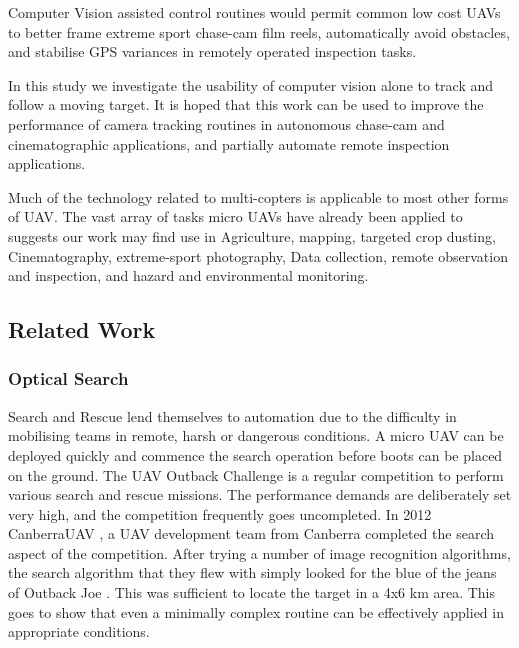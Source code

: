 \documentclass{article}
\begin{document}
      Computer Vision assisted control routines would permit common low cost UAVs to better frame extreme sport chase-cam film reels, automatically avoid obstacles, and stabilise GPS variances in remotely operated inspection tasks.

      In this study we investigate the usability of computer vision alone to track and follow a moving target.  It is hoped that this work can be used to improve the performance of camera tracking routines in autonomous chase-cam and cinematographic applications, and partially automate remote inspection applications.

      Much of the technology related to multi-copters is applicable to most other forms of UAV.  The vast array of tasks micro UAVs have already been applied to suggests our work may find use in Agriculture, mapping, targeted crop dusting, Cinematography, extreme-sport photography, Data collection, remote observation and inspection, and hazard and environmental monitoring.
    \subsection{Related Work}
      \subsubsection{Optical Search}
        Search and Rescue lend themselves to automation due to the difficulty in mobilising teams in remote, harsh or dangerous conditions.  A micro UAV can be deployed quickly and commence the search operation before boots can be placed on the ground.
        The UAV Outback Challenge \cite{OutbackChallenge} is a regular competition to perform various search and rescue missions.  The performance demands are deliberately set very high, and the competition frequently goes uncompleted.  
        In 2012 CanberraUAV \cite{canberrauav}, a UAV development team from Canberra completed the search aspect of the competition.
        After trying a number of image recognition algorithms, the search algorithm that they flew with simply looked for the blue of the jeans of Outback Joe \cite{tridge}. This was sufficient to locate the target in a 4x6 km area.  This goes to show that even a minimally complex routine can be effectively applied in appropriate conditions.
\end{document}
